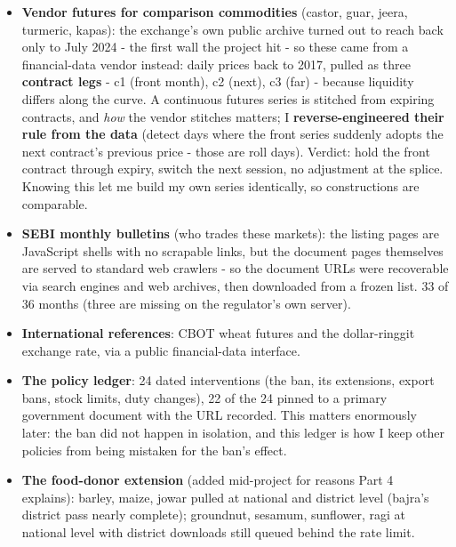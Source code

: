 \documentclass[11pt]{article}
\begin{document}
\begin{itemize}[leftmargin=1.8em,itemsep=1pt]
  \item \textbf{Vendor futures for comparison commodities} (castor, guar, jeera, turmeric,
        kapas): the exchange's own public archive turned out to reach back only to July
        2024 - the first wall the project hit - so these came from a financial-data vendor
        instead: daily prices back to 2017, pulled as three \textbf{contract legs} - c1
        (front month), c2 (next), c3 (far) - because liquidity differs along the curve.
        A continuous futures series is stitched from expiring contracts, and \emph{how}
        the vendor stitches matters; I \textbf{reverse-engineered their rule from the data}
        (detect days where the front series suddenly adopts the next contract's previous
        price - those are roll days). Verdict: hold the front contract through expiry,
        switch the next session, no adjustment at the splice. Knowing this let me build my
        own series identically, so constructions are comparable.
  \item \textbf{SEBI monthly bulletins} (who trades these markets): the listing pages are
        JavaScript shells with no scrapable links, but the document pages themselves are
        served to standard web crawlers - so the document URLs were recoverable via search
        engines and web archives, then downloaded from a frozen list. 33 of 36 months
        (three are missing on the regulator's own server).
  \item \textbf{International references}: CBOT wheat futures and the dollar-ringgit
        exchange rate, via a public financial-data interface.
  \item \textbf{The policy ledger}: 24 dated interventions (the ban, its extensions,
        export bans, stock limits, duty changes), 22 of the 24 pinned to a primary
        government document with the URL recorded. This matters enormously later: the ban
        did not happen in isolation, and this ledger is how I keep other policies from
        being mistaken for the ban's effect.
  \item \textbf{The food-donor extension} (added mid-project for reasons Part 4 explains):
        barley, maize, jowar pulled at national and district level (bajra's district pass
        nearly complete); groundnut, sesamum, sunflower, ragi at national level with
        district downloads still queued behind the rate limit.
\end{itemize}
\end{document}
